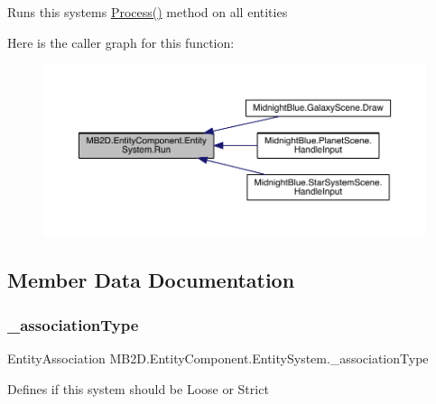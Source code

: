 Runs this systems \hyperlink{class_m_b2_d_1_1_entity_component_1_1_entity_system_abbf83b87cb5d12754fb058cef50451fa}{Process()} method on all entities 

Here is the caller graph for this function\+:\nopagebreak
\begin{figure}[H]
\begin{center}
\leavevmode
\includegraphics[width=350pt]{class_m_b2_d_1_1_entity_component_1_1_entity_system_a3a1a74c4d3f8f0f452e0cdaa5515face_icgraph}
\end{center}
\end{figure}


\subsection{Member Data Documentation}
\hypertarget{class_m_b2_d_1_1_entity_component_1_1_entity_system_a1e5512e27d2cf3f40dcf8f39975ca1d7}{}\label{class_m_b2_d_1_1_entity_component_1_1_entity_system_a1e5512e27d2cf3f40dcf8f39975ca1d7} 
\subsubsection{\texorpdfstring{\+\_\+association\+Type}{\_associationType}}
{\footnotesize\ttfamily Entity\+Association M\+B2\+D.\+Entity\+Component.\+Entity\+System.\+\_\+association\+Type\hspace{0.3cm}{\ttfamily [protected]}}



Defines if this system should be Loose or Strict 

\hypertarget{class_m_b2_d_1_1_entity_component_1_1_entity_system_a7415c4bff1132bb4dadcc1a072c663da}{}\label{class_m_b2_d_1_1_entity_component_1_1_entity_system_a7415c4bff1132bb4dadcc1a072c663da} 
